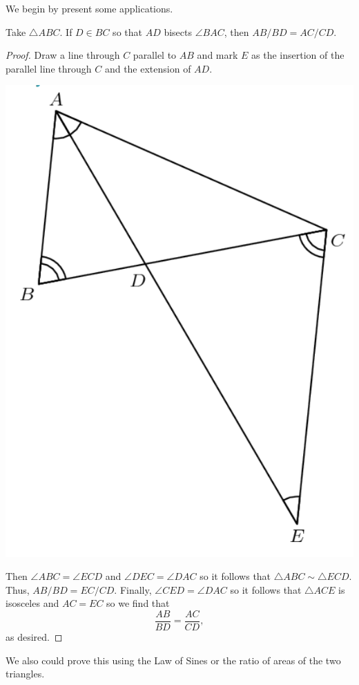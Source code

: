 \documentclass[12pt]{scrartcl}
\newcommand{\<}{\langle}
\renewcommand{\>}{\rangle}
\begin{document}
We begin by present some applications.
\begin{thm} Take $\triangle ABC$.  If $D \in BC$ so that $AD$ bisects $\angle BAC$, then $AB/BD = AC/CD$.
\end{thm}
\begin{proof}
Draw a line through $C$ parallel to $AB$ and mark $E$ as the insertion of the parallel line through $C$ and the extension of $AD$. 
\begin{center}
\includegraphics[scale=0.5]{graphics/angBis.png}
\end{center}

Then $\angle ABC = \angle ECD$ and $\angle DEC = \angle DAC$ so it follows that $\triangle ABC \sim \triangle ECD$.  Thus, $AB/BD = EC/CD$.  Finally, $\angle CED = \angle DAC$ so it follows that $\triangle ACE$ is isosceles and $AC = EC$ so we find that 
$$\frac{AB}{BD} = \frac{AC}{CD},$$
as desired.
\end{proof}
\begin{remark} We also could prove this using the Law of Sines or the ratio of areas of the two triangles.
\end{remark}
\end{document}
